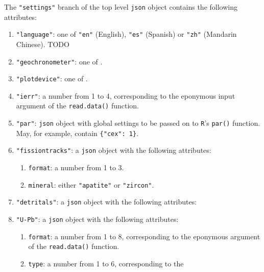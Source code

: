 \begin{refsection}
\noindent The \texttt{"settings"} branch of the top level
\texttt{json} object contains the following attributes:

\begin{enumerate}[leftmargin=\parindent,align=left,
      labelwidth=\parindent,label*=2.\arabic*.]
\item{\tt "language"}: one of \texttt{"en"} (English), \texttt{"es"}
  (Spanish) or \texttt{"zh"} (Mandarin Chinese). TODO
\item{\tt "geochronometer"}: one of .
\item{\tt "plotdevice"}: one of .
\item{\tt "ierr"}: a number from 1 to 4, corresponding to the
  eponymous input argument of the \texttt{read.data()} function.
\item{\tt "par"}: \texttt{json} object with global settings to be
  passed on to \texttt{R}'s \texttt{par()} function. May, for example,
  contain \texttt{\{"cex": 1\}}.
\item{\tt "fissiontracks"}: a \texttt{json} object with the following
  attributes:
  \begin{enumerate}[leftmargin=0,align=left,labelwidth=\parindent,label*=\arabic*.]
  \item{\tt format}: a number from 1 to 3.
  \item{\tt mineral}: either \texttt{"apatite"} or \texttt{"zircon"}.
  \end{enumerate}
\item{\tt "detritals"}: a \texttt{json} object with the following
  attributes:
\item{\tt "U-Pb"}: a \texttt{json} object with the following
  attributes:
  \begin{enumerate}[leftmargin=0,align=left,labelwidth=\parindent,label*=\arabic*.]
  \item{\tt format}: a number from 1 to 8, corresponding to the
    eponymous argument of the \texttt{read.data()} function.
  \item{\tt type}: a number from 1 to 6, corresponding to the

\end{enumerate}
\end{enumerate}
\end{refsection}
